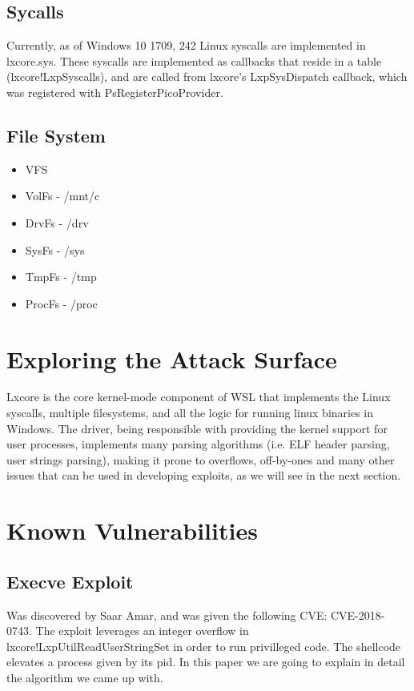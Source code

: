 \documentclass[conference]{IEEEtran}
\begin{document}
\subsection{Sycalls}

    Currently, as of Windows 10 1709, 242 Linux syscalls are implemented in lxcore.sys. These syscalls are implemented as callbacks that reside
    in a table (lxcore!LxpSyscalls), and are called from lxcore's LxpSysDispatch callback, which was registered with PsRegisterPicoProvider.\\

\subsection{File System}

\begin{itemize}
    \item VFS
    \item VolFs - /mnt/c
    \item DrvFs - /drv
    \item SysFs - /sys
    \item TmpFs - /tmp 
    \item ProcFs - /proc
\end{itemize}

\section{Exploring the Attack Surface}
    Lxcore is the core kernel-mode component of WSL that implements the Linux syscalls, multiple filesystems, and all the logic for running
    linux binaries in Windows. The driver, being responsible with providing the kernel support for user processes, implements many parsing
    algorithms (i.e. ELF header parsing, user strings parsing), making it prone to overflows, off-by-ones and many other issues that can be
    used in developing exploits, as we will see in the next section.\\

\section{Known Vulnerabilities}

    \subsection{Execve Exploit}
    Was discovered by Saar Amar, and was given the following CVE: CVE-2018-0743. The exploit leverages an integer overflow in
    lxcore!LxpUtilReadUserStringSet in order to run privilleged code. The shellcode elevates a process given by its pid. In this paper we are going
    to explain in detail the algorithm we came up with.\\
\end{document}
